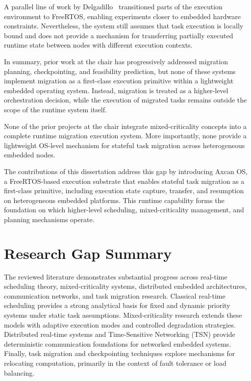 A parallel line of work by Delgadillo~\cite{delgadillo1} transitioned parts of the
execution environment to FreeRTOS, enabling experiments closer to embedded hardware
constraints. Nevertheless, the system still assumes that task execution is locally
bound and does not provide a mechanism for transferring partially executed runtime
state between nodes with different execution contexts.

In summary, prior work at the chair has progressively addressed migration planning,
checkpointing, and feasibility prediction, but none of these systems implement
migration as a first-class execution primitive within a lightweight embedded
operating system. Instead, migration is treated as a higher-level orchestration
decision, while the execution of migrated tasks remains outside the scope of the
runtime system itself.

None of the prior projects at the chair integrate mixed-criticality concepts into
a complete runtime migration execution system. More importantly, none provide a
lightweight OS-level mechanism for stateful task migration across heterogeneous
embedded nodes.

The contributions of this dissertation address this gap by introducing Axcan OS,
a FreeRTOS-based execution substrate that enables stateful task migration as a
first-class primitive, including execution state capture, transfer, and resumption
on heterogeneous embedded platforms. This runtime capability forms the foundation
on which higher-level scheduling, mixed-criticality management, and planning
mechanisms operate.

\section{Research Gap Summary}
\label{sec:rw_gap}

The reviewed literature demonstrates substantial progress across real-time scheduling theory,
mixed-criticality systems, distributed embedded architectures, communication networks, and
task migration research. Classical real-time scheduling provides a strong analytical basis
for fixed and dynamic priority systems under static task assumptions. Mixed-criticality
research extends these models with adaptive execution modes and controlled degradation
strategies. Distributed real-time systems and Time-Sensitive Networking (TSN) provide
deterministic communication foundations for networked embedded systems. Finally, task
migration and checkpointing techniques explore mechanisms for relocating computation,
primarily in the context of fault tolerance or load balancing.

